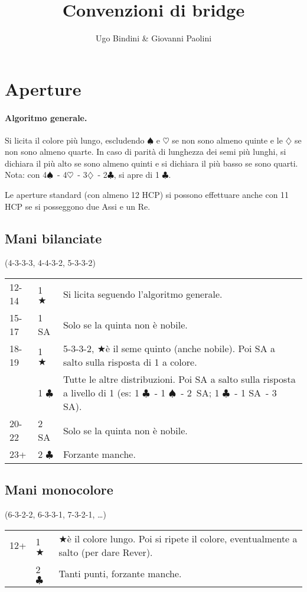 \documentclass[a4paper,10pt]{article}
\title{Convenzioni di bridge}
\author{Ugo Bindini \& Giovanni Paolini}
\renewcommand{\c}{$\clubsuit$\xspace}
\renewcommand{\d}{$\diamondsuit$\xspace}
\newcommand{\h}{$\heartsuit$\xspace}
\newcommand{\s}{$\spadesuit$\xspace}
\renewcommand{\j}{$\bigstar$\xspace}
\newcommand{\sa}{SA\xspace}
\newcommand{\smallspace}{\vskip0.3cm}
\newenvironment{threecol}
  {\smallspace\noindent\begin{tabular}{l l p{0.78\textwidth}}}
  {\end{tabular}\smallspace}
\begin{document}
\maketitle

\tableofcontents

\pagebreak
\section{Aperture}

\paragraph{Algoritmo generale.}
Si licita il colore pi\`u lungo, escludendo \s e \h se non sono almeno quinte e le \d se non sono almeno quarte.
In caso di parit\`a di lunghezza dei semi pi\`u lunghi, si dichiara il pi\`u alto se sono almeno quinti e si dichiara il pi\`u basso se sono quarti.
Nota: con 4\s\ - 4\h\ - 3\d\ - 2\c, si apre di 1 \c.

\noindent Le aperture standard (con almeno 12 HCP) si possono effettuare anche con 11 HCP se si posseggono due Assi e un Re.

\subsection{Mani bilanciate}
(4-3-3-3, 4-4-3-2, 5-3-3-2)
\smallspace

\begin{threecol}
 12-14 & 1 \j & Si licita seguendo l'algoritmo generale.\\
 15-17 & 1 \sa & Solo se la quinta non \`e nobile.\\
 18-19 & 1 \j & 5-3-3-2, \j \`e il seme quinto (anche nobile). Poi \sa a salto sulla risposta di 1 a colore.\\
       & 1 \c & Tutte le altre distribuzioni. Poi \sa a salto sulla risposta a livello di 1 (es: 1 \c\ - 1 \s\ - \mbox{2 \sa}; 1 \c\ - 1 \sa\ - 3 \sa).\\
 20-22 & 2 \sa & Solo se la quinta non è nobile.\\
 23+ & 2 \c & Forzante manche.
\end{threecol}


\subsection{Mani monocolore}
(6-3-2-2, 6-3-3-1, 7-3-2-1, \dots)

\begin{threecol}
 12+ & 1 \j & \j \`e il colore lungo. Poi si ripete il colore, eventualmente a salto (per dare Rever).\\
 & 2 \c & Tanti punti, forzante manche.
\end{threecol}
\end{document}
